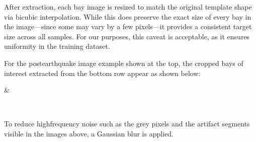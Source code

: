 \documentclass[letterpaper,10pt,english]{sphinxmanual}
\begin{document}
\sphinxAtStartPar
After extraction, each bay image is resized to match the original template
shape via bicubic interpolation.
While this does  preserve the exact size of every bay in the image—since
some may vary by a few pixels—it provides a consistent target size across all
samples.
For our purposes, this caveat is acceptable, as it ensures uniformity in the
training dataset.

\sphinxAtStartPar
For the post\sphinxhyphen{}earthquake image example shown at the top, the cropped bays of
interest extracted from the bottom row appear as shown below:


\begin{savenotes}\sphinxattablestart
\sphinxthistablewithglobalstyle
\centering
\begin{tabular}[t]{}
\sphinxtoprule
\sphinxtableatstartofbodyhook

\begin{sphinxfigure-in-table}
\centering
\capstart
\noindent{}
\label{\detokenize{data:id12}}\end{sphinxfigure-in-table}\relax
&

\begin{sphinxfigure-in-table}
\centering
\capstart
\noindent{}
\label{\detokenize{data:id13}}\end{sphinxfigure-in-table}\relax
\\
\sphinxbottomrule
\end{tabular}
\sphinxtableafterendhook\par
\sphinxattableend\end{savenotes}

\sphinxAtStartPar
To reduce high\sphinxhyphen{}frequency noise such as the grey pixels and the artifact segments
visible in the images above, a Gaussian blur is applied.
\end{document}
